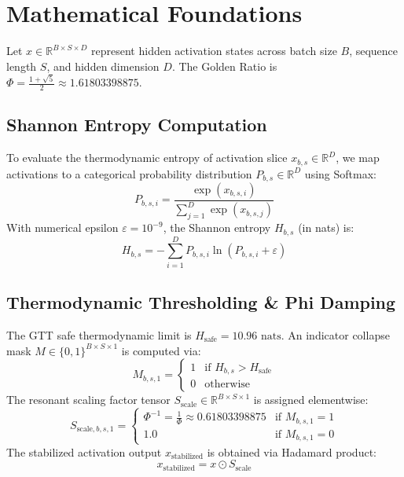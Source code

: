 \section{Mathematical Foundations}
Let $x \in \mathbb{R}^{B \times S \times D}$ represent hidden activation states across batch size $B$, sequence length $S$, and hidden dimension $D$. The Golden Ratio is $\Phi = \frac{1+\sqrt{5}}{2} \approx 1.61803398875$.

\subsection{Shannon Entropy Computation}
To evaluate the thermodynamic entropy of activation slice $x_{b, s} \in \mathbb{R}^D$, we map activations to a categorical probability distribution $P_{b, s} \in \mathbb{R}^D$ using Softmax:
\begin{equation}
    P_{b, s, i} = \frac{\exp(x_{b, s, i})}{\sum_{j=1}^D \exp(x_{b, s, j})}
\end{equation}
With numerical epsilon $\varepsilon = 10^{-9}$, the Shannon entropy $H_{b, s}$ (in nats) is:
\begin{equation}
    H_{b, s} = -\sum_{i=1}^D P_{b, s, i} \ln(P_{b, s, i} + \varepsilon)
\end{equation}

\subsection{Thermodynamic Thresholding \& Phi Damping}
The GTT safe thermodynamic limit is $H_{\text{safe}} = 10.96\text{ nats}$. An indicator collapse mask $M \in \{0, 1\}^{B \times S \times 1}$ is computed via:
\begin{equation}
    M_{b, s, 1} = \begin{cases} 1 & \text{if } H_{b, s} > H_{\text{safe}} \\ 0 & \text{otherwise} \end{cases}
\end{equation}
The resonant scaling factor tensor $S_{\text{scale}} \in \mathbb{R}^{B \times S \times 1}$ is assigned elementwise:
\begin{equation}
    S_{\text{scale}, b, s, 1} = \begin{cases} \Phi^{-1} = \frac{1}{\Phi} \approx 0.61803398875 & \text{if } M_{b, s, 1} = 1 \\ 1.0 & \text{if } M_{b, s, 1} = 0 \end{cases}
\end{equation}
The stabilized activation output $x_{\text{stabilized}}$ is obtained via Hadamard product:
\begin{equation}
    x_{\text{stabilized}} = x \odot S_{\text{scale}}
\end{equation}